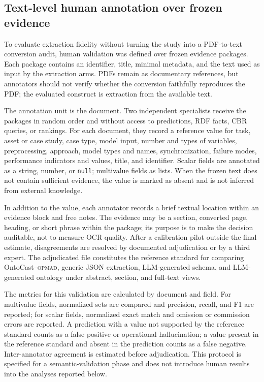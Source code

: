\documentclass[journal]{IEEEtran}
\newcommand{\OPMAD}{\textsc{opmad}}
\begin{document}
\subsection{Text-level human annotation over frozen evidence}
\label{sec:human-annotation}

To evaluate extraction fidelity without turning the study into a PDF-to-text conversion audit, human validation was defined over frozen evidence packages. Each package contains an identifier, title, minimal metadata, and the text used as input by the extraction arms. PDFs remain as documentary references, but annotators should not verify whether the conversion faithfully reproduces the PDF; the evaluated construct is extraction from the available text.

The annotation unit is the document. Two independent specialists receive the packages in random order and without access to predictions, RDF facts, CBR queries, or rankings. For each document, they record a reference value for task, asset or case study, case type, model input, number and types of variables, preprocessing, approach, model types and names, synchronization, failure modes, performance indicators and values, title, and identifier. Scalar fields are annotated as a string, number, or \texttt{null}; multivalue fields as lists. When the frozen text does not contain sufficient evidence, the value is marked as absent and is not inferred from external knowledge.

In addition to the value, each annotator records a brief textual location within an evidence block and free notes. The evidence may be a section, converted page, heading, or short phrase within the package; its purpose is to make the decision auditable, not to measure OCR quality. After a calibration pilot outside the final estimate, disagreements are resolved by documented adjudication or by a third expert. The adjudicated file constitutes the reference standard for comparing OntoCast--\OPMAD{}, generic JSON extraction, LLM-generated schema, and LLM-generated ontology under abstract, section, and full-text views.

The metrics for this validation are calculated by document and field. For multivalue fields, normalized sets are compared and precision, recall, and F1 are reported; for scalar fields, normalized exact match and omission or commission errors are reported. A prediction with a value not supported by the reference standard counts as a false positive or operational hallucination; a value present in the reference standard and absent in the prediction counts as a false negative. Inter-annotator agreement is estimated before adjudication. This protocol is specified for a semantic-validation phase and does not introduce human results into the analyses reported below.
\end{document}
